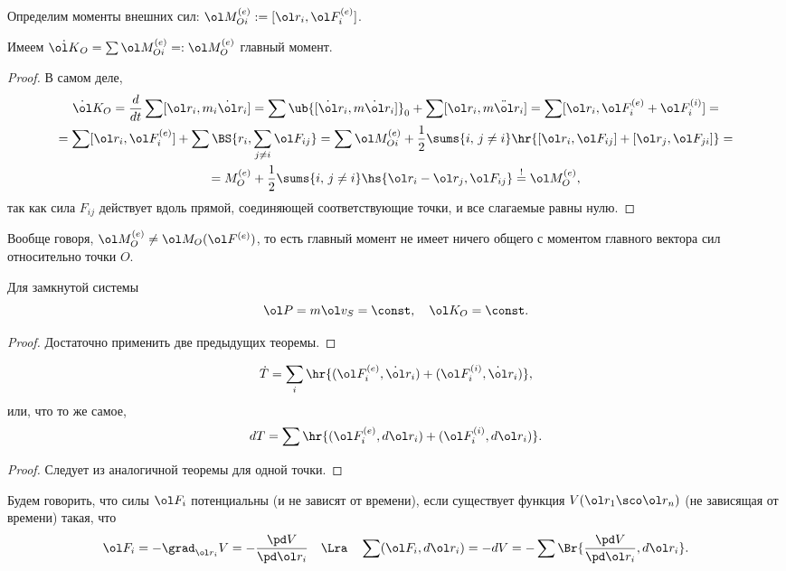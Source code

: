 \documentclass[a4paper,12pt]{article}
\def\F{\ol F}
\def\r{\ol r}
\def\v{\ol v}
\def\K{\ol K_O}
\def\MO{\ol M_O}
\def\M{\ol M}
\def\P{\ol P}
\def\dd{\ddot}
\def\d{\dot}
\begin{document}
Определим моменты внешних сил: $\M_{Oi}^{(e)}:=[\r_i,\F_i^{(e)}]$.

\begin{theorem}\label{thm:KinMomDiff}
Имеем $\d{\ol K}_O=\sum\M_{Oi}^{(e)}=:\MO^{(e)}$ главный момент.
\end{theorem}
\begin{proof}
В самом деле,
\begin{multline*}
\d\K=\frac{d}{dt}\sum[\r_i,m_i\d\r_i]=
\sum\ub{[\d\r_i, m\d\r_i]}_0 + \sum[\r_i, m\dd\r_i]=
\sum[\r_i, \F_i^{(e)}+\F_i^{(i)}]=\\=
\sum[\r_i, \F_i^{(e)}]+\sum \BS{r_i,\sum_{j\ne i}\F_{ij}}=
\sum \ol M_{Oi}^{(e)}+\frac12\sums{i,\, j\ne i}\hr{[\r_i, \F_{ij}]+ [\r_j, \F_{ji}]}=\\=
M_O^{(e)}+\frac12\sums{i,\, j\ne i}\hs{\r_i-\r_j,\F_{ij}}\stackrel{!}{=}\ol M_O^{(e)},
\end{multline*}
так как сила $F_{ij}$ действует вдоль прямой, соединяющей
соответствующие точки, и все слагаемые равны нулю.
\end{proof}

\begin{note}
Вообще говоря, $\MO^{(e)}\ne \M_O(\F^{(e)})$,
то есть главный момент не имеет ничего общего с моментом
главного вектора сил относительно точки $O$.
\end{note}

\begin{imp}
Для замкнутой системы
$$\P=m\v_S=\const, \quad \K=\const.$$
\end{imp}
\begin{proof}
Достаточно применить две предыдущих теоремы.
\end{proof}

\begin{theorem}
$$\d T=\sum_i\hr{(\F_i^{(e)},\d\r_i)+(\F_i^{(i)},\d\r_i)},$$
или, что то же самое,
$$dT=\sum\hr{(\F_i^{(e)},d\r_i)+(\F_i^{(i)},d\r_i)}.$$
\end{theorem}
\begin{proof}
Следует из аналогичной теоремы для одной точки.
\end{proof}

\begin{df}
Будем говорить, что силы $\F_i$ потенциальны (и не зависят от времени),
если существует функция $V(\r_1\sco\r_n)$ (не зависящая от
времени) такая, что
$$\F_i=-\grad_{\r_i}V=-\frac{\pd V}{\pd\r_i}\quad\Lra\quad
\sum(\F_i,d\r_i)=-dV=-\sum\Br{\frac{\pd V}{\pd\r_i}, d\r_i}.$$
\end{df}
\end{document}

